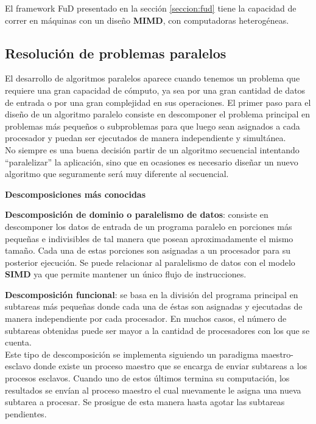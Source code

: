 El framework FuD presentado en la sección \ref{seccion:fud} tiene la capacidad de correr en máquinas con un diseño \textbf{MIMD}, con computadoras heterogéneas.


\subsection{Resolución de problemas paralelos}

El desarrollo de algoritmos paralelos aparece cuando tenemos un problema que requiere una gran capacidad de cómputo, ya sea por una gran cantidad de datos de entrada o por una gran complejidad en sus operaciones. El primer paso para el diseño de un algoritmo paralelo consiste en descomponer el problema principal en problemas más pequeños o subproblemas para que luego sean asignados a cada procesador y puedan ser ejecutados de manera independiente y simultánea.\\
No siempre es una buena decisión partir de un algoritmo secuencial intentando ``paralelizar'' la aplicación, sino que en ocasiones es necesario diseñar un nuevo algoritmo que seguramente será muy diferente al secuencial.

\textbf{\newline \large Descomposiciones más conocidas}

\textbf{\newline Descomposición de dominio o paralelismo de datos}: consiste en descomponer los datos de entrada de un programa 
paralelo en porciones más pequeñas e indivisibles de tal manera que posean aproximadamente el mismo tamaño. Cada una de estas porciones son asignadas a un procesador para su posterior ejecución. Se puede relacionar al paralelismo de datos con el modelo \textbf{SIMD} ya que permite mantener un único flujo de instrucciones.

\textbf{\newline Descomposición funcional}: se basa en la división del programa principal en subtareas más pequeñas donde cada una de éstas son asignadas y ejecutadas de manera independiente por cada procesador. En muchos casos, el número de subtareas obtenidas puede ser mayor a la cantidad de procesadores con los que se cuenta. \\
Este tipo de descomposición se implementa siguiendo un paradigma maestro-esclavo donde existe un proceso maestro que se encarga de enviar subtareas a los procesos
 esclavos. Cuando uno de estos últimos termina su computación, los resultados se envían al proceso maestro el cual nuevamente le asigna una nueva subtarea a procesar.
 Se prosigue de esta manera hasta agotar las subtareas pendientes.

